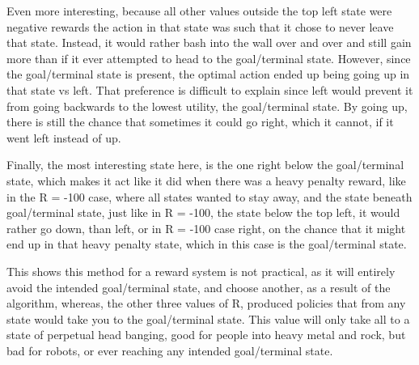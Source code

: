 \documentclass[12pt]{article}
\begin{document}
\begin{description}[leftmargin=0cm]
		Even more interesting, because all other values outside the top left state were
		negative rewards the action in that state was such that it chose to never leave that
		state. Instead, it would rather bash into the wall over and over and still gain more
		than if it ever attempted to head to the goal/terminal state. However, since the
		goal/terminal state is present, the optimal action ended up being going up in that
		state vs left. That preference is difficult to explain since left would prevent it
		from going backwards to the lowest utility, the goal/terminal state. By going up,
		there is still the chance that sometimes it could go right, which it cannot, if it
		went left instead of up.
		
		Finally, the most interesting state here, is the one right below the goal/terminal
		state, which makes it act like it did when there was a heavy penalty reward, like
		in the R = -100 case, where all states wanted to stay away, and the state beneath
		goal/terminal state, just like in R = -100, the state below the top left, it would
		rather go down, than left, or in R = -100 case right, on the chance that it might
		end up in that heavy penalty state, which in this case is the goal/terminal state.
		
		This shows this method for a reward system is not practical, as it will entirely
		avoid the intended goal/terminal state, and choose another, as a result of the
		algorithm, whereas, the other three values of R, produced policies that from any
		state would take you to the goal/terminal state. This value will only take all
		to a state of perpetual head banging, good for people into heavy metal and rock,
		but bad for robots, or ever reaching any intended goal/terminal state.
		

\end{description}
\end{document}
